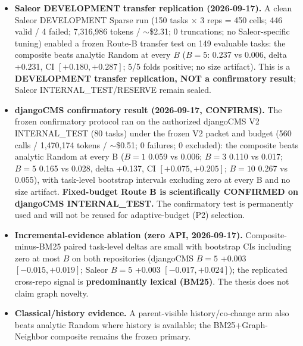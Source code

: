 \documentclass[11pt,a4paper]{article}
\begin{document}
\begin{itemize}
        per the ranker-identity audit) recovers Sparse-omitted missed files in
        the observed historical change-set proxy above the analytic-Random
        baseline across the whole budget curve
        $B \in \{1,3,5,10\}$, with task-level bootstrap intervals excluding
        zero at every point (e.g.\ at $B{=}5$: pooled macro recovery 0.163 vs
        random 0.029, interval $[+0.09,+0.18]$), 5/5 development folds
        positive, and no omitted/universe-size artifact. A small verifier
        pilot (30 calls, $\sim$\$0.002) found the frozen ranker places the
        recoverable missed files within the top-$B$ (Oracle-in-top-$B$
        $\approx$ 1.0) and the verifier recovers $\sim$0.86--1.0 of them, so
        the dominant loss is first-pass omission.
  \item \textbf{Saleor DEVELOPMENT transfer replication (2026-09-17).} A clean
        Saleor DEVELOPMENT Sparse run (150 tasks $\times$ 3 reps = 450 cells;
        446 valid / 4 failed; 7,316,986 tokens / $\sim$\$2.31; 0 truncations;
        no Saleor-specific tuning) enabled a frozen Route-B transfer test on
        149 evaluable tasks: the composite beats analytic Random at every
        $B$ ($B{=}5$: 0.237 vs 0.006, delta +0.231, CI
        $[+0.180,+0.287]$; 5/5 folds positive; no size artifact). This is a
        \textbf{DEVELOPMENT transfer replication, NOT a confirmatory result};
        Saleor INTERNAL\_TEST/RESERVE remain sealed.
  \item \textbf{djangoCMS confirmatory result (2026-09-17, CONFIRMS).} The
        frozen confirmatory protocol ran on the authorized djangoCMS V2
        INTERNAL\_TEST (80 tasks) under the frozen V2 packet and budget
        (560 calls / 1,470,174 tokens / $\sim$\$0.51; 0 failures; 0 excluded):
        the composite beats analytic Random at every B ($B{=}1$ 0.059 vs
        0.006; $B{=}3$ 0.110 vs 0.017; $B{=}5$ 0.165 vs 0.028, delta +0.137,
        CI $[+0.075,+0.205]$; $B{=}10$ 0.267 vs 0.055), with task-level
        bootstrap intervals excluding zero at every B and no size artifact.
        \textbf{Fixed-budget Route B is scientifically CONFIRMED on djangoCMS
        INTERNAL\_TEST.} The confirmatory test is permanently used and will
        not be reused for adaptive-budget (P2) selection.
  \item \textbf{Incremental-evidence ablation (zero API, 2026-09-17).}
        Composite-minus-BM25 paired task-level deltas are small with bootstrap
        CIs including zero at most $B$ on both repositories (djangoCMS
        $B{=}5$ +0.003 $[-0.015,+0.019]$; Saleor $B{=}5$ +0.003
        $[-0.017,+0.024]$); the replicated cross-repo signal is
        \textbf{predominantly lexical (BM25)}. The thesis does not claim graph
        novelty.
  \item \textbf{Classical/history evidence.} A parent-visible history/co-change
        arm also beats analytic Random where history is available; the
        BM25+Graph-Neighbor composite remains the frozen primary.
\end{itemize}
\end{document}
